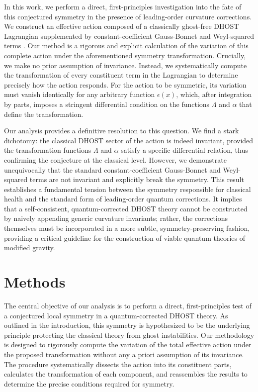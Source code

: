 \documentclass[twocolumn]{aastex631}
\begin{document}
In this work, we perform a direct, first-principles investigation into the fate of this conjectured symmetry in the presence of leading-order curvature corrections. We construct an effective action composed of a classically ghost-free DHOST Lagrangian \citep{babichev2023rotatingblackholesembedded,brax2025primordialgravitationalwavesdhost} supplemented by constant-coefficient Gauss-Bonnet and Weyl-squared terms \citep{cisterna2025thermodynamicsfourdimensionalregularblack}. Our method is a rigorous and explicit calculation of the variation of this complete action under the aforementioned symmetry transformation. Crucially, we make no prior assumption of invariance. Instead, we systematically compute the transformation of every constituent term in the Lagrangian to determine precisely how the action responds. For the action to be symmetric, its variation must vanish identically for any arbitrary function $\epsilon(x)$, which, after integration by parts, imposes a stringent differential condition on the functions $\Lambda$ and $\alpha$ that define the transformation.

Our analysis provides a definitive resolution to this question. We find a stark dichotomy: the classical DHOST sector of the action is indeed invariant, provided the transformation functions $\Lambda$ and $\alpha$ satisfy a specific differential relation, thus confirming the conjecture at the classical level. However, we demonstrate unequivocally that the standard constant-coefficient Gauss-Bonnet and Weyl-squared terms are not invariant and explicitly break the symmetry. This result establishes a fundamental tension between the symmetry responsible for classical health and the standard form of leading-order quantum corrections. It implies that a self-consistent, quantum-corrected DHOST theory cannot be constructed by naively appending generic curvature invariants; rather, the corrections themselves must be incorporated in a more subtle, symmetry-preserving fashion, providing a critical guideline for the construction of viable quantum theories of modified gravity.

\section{Methods}
\label{sec:methods}
The central objective of our analysis is to perform a direct, first-principles test of a conjectured local symmetry in a quantum-corrected DHOST theory. As outlined in the introduction, this symmetry is hypothesized to be the underlying principle protecting the classical theory from ghost instabilities. Our methodology is designed to rigorously compute the variation of the total effective action under the proposed transformation without any a priori assumption of its invariance. The procedure systematically dissects the action into its constituent parts, calculates the transformation of each component, and reassembles the results to determine the precise conditions required for symmetry.
\end{document}

